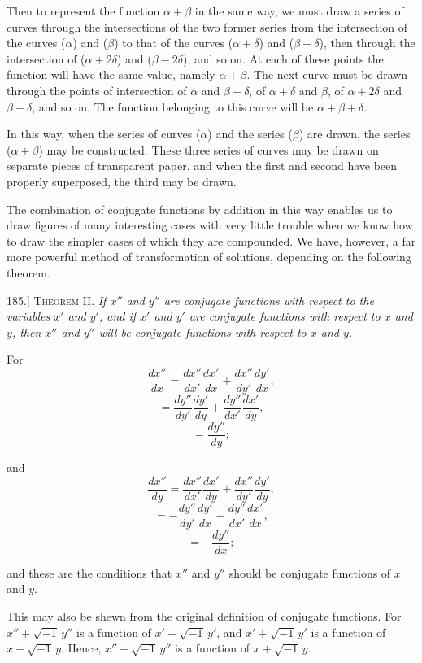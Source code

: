 \documentclass[11pt,a4paper]{article}
\begin{document}
Then to represent the function $\alpha+\beta$ in the same way, we must draw a series of curves through the intersections of the two former series from the intersection of the curves ($\alpha$) and ($\beta$) to that of the curves ($\alpha+\delta$) and ($\beta-\delta$), then through the intersection of ($\alpha+2\delta$) and ($\beta-2\delta$), and so on. At each of these points the function will have the same value, namely $\alpha+\beta$. The next curve must be drawn through the points of intersection of $\alpha$ and $\beta+\delta$, of $\alpha+\delta$ and $\beta$, of $\alpha+2\delta$ and $\beta-\delta$, and so on. The function belonging to this curve will be $\alpha+\beta+\delta$.

In this way, when the series of curves ($\alpha$) and the series ($\beta$) are drawn, the series ($\alpha+\beta$) may be constructed. These three series of curves may be drawn on separate pieces of transparent paper, and when the first and second have been properly superposed, the third may be drawn.

The combination of conjugate functions by addition in this way enables us to draw figures of many interesting cases with very little trouble when we know how to draw the simpler cases of which they are compounded. We have, however, a far more powerful method of transformation of solutions, depending on the following theorem.

185.] \textsc{Theorem II.} \textit{If $x''$ and $y''$ are conjugate functions with respect to the variables $x'$ and $y'$, and if $x'$ and $y'$ are conjugate functions with respect to $x$ and $y$, then $x''$ and $y''$ will be conjugate functions with respect to $x$ and $y$.}

For
\[
\frac{dx''}{dx}
= \frac{dx''}{dx'}\frac{dx'}{dx}
 +\frac{dx''}{dy'}\frac{dy'}{dx},
\]
\[
= \frac{dy''}{dy'}\frac{dy'}{dy}
 +\frac{dy''}{dx'}\frac{dx'}{dy},
\]
\[
= \frac{dy''}{dy};
\]

and
\[
\frac{dx''}{dy}
= \frac{dx''}{dx'}\frac{dx'}{dy}
 +\frac{dx''}{dy'}\frac{dy'}{dy},
\]
\[
= -\frac{dy''}{dy'}\frac{dy'}{dx}
 -\frac{dy''}{dx'}\frac{dx'}{dx},
\]
\[
= -\frac{dy''}{dx};
\]

and these are the conditions that $x''$ and $y''$ should be conjugate functions of $x$ and $y$.

This may also be shewn from the original definition of conjugate functions. For $x''+\sqrt{-1}\,y''$ is a function of $x'+\sqrt{-1}\,y'$, and $x'+\sqrt{-1}\,y'$ is a function of $x+\sqrt{-1}\,y$. Hence, $x''+\sqrt{-1}\,y''$ is a function of $x+\sqrt{-1}\,y$.
\end{document}
